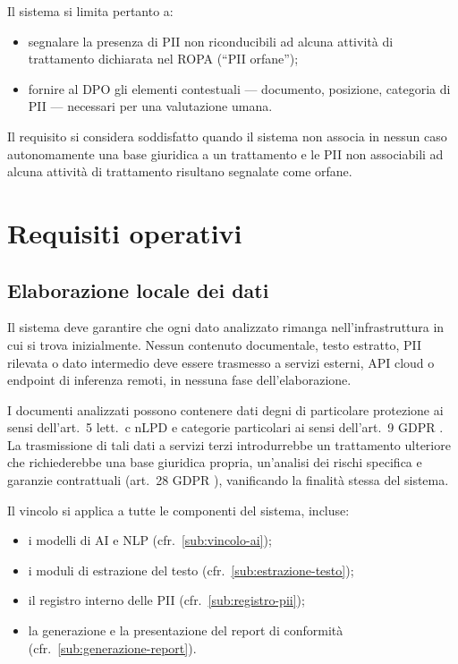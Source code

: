 Il sistema si limita pertanto a:
\begin{itemize}
	\item segnalare la presenza di PII non riconducibili ad alcuna attività di trattamento dichiarata nel ROPA (``PII orfane'');
	\item fornire al DPO gli elementi contestuali --- documento, posizione, categoria di PII --- necessari per una valutazione umana.
\end{itemize} \medskip

Il requisito si considera soddisfatto quando il sistema non associa in nessun caso autonomamente una base giuridica a un trattamento e le PII non associabili ad alcuna attività di trattamento risultano segnalate come orfane.


\section{Requisiti operativi}
\label{sec:requisiti-operativi}

\subsection{Elaborazione locale dei dati}
\label{sub:elaborazione-locale}
Il sistema deve garantire che ogni dato analizzato rimanga nell'infrastruttura in cui si trova inizialmente. Nessun contenuto documentale, testo estratto, PII rilevata o dato intermedio deve essere trasmesso a servizi esterni, API cloud o endpoint di inferenza remoti, in nessuna fase dell'elaborazione. \medskip

I documenti analizzati possono contenere dati degni di particolare protezione ai sensi dell'art.~5 lett.~c nLPD \cite{RS2351Legge} e categorie particolari ai sensi dell'art.~9 GDPR \cite{RegolamentoUE20162016}. La trasmissione di tali dati a servizi terzi introdurrebbe un trattamento ulteriore che richiederebbe una base giuridica propria, un'analisi dei rischi specifica e garanzie contrattuali (art.~28 GDPR \cite{RegolamentoUE20162016}), vanificando la finalità stessa del sistema. \medskip

Il vincolo si applica a tutte le componenti del sistema, incluse:
\begin{itemize}
	\item i modelli di AI e NLP (cfr.~\ref{sub:vincolo-ai});
	\item i moduli di estrazione del testo (cfr.~\ref{sub:estrazione-testo});
	\item il registro interno delle PII (cfr.~\ref{sub:registro-pii});
	\item la generazione e la presentazione del report di conformità (cfr.~\ref{sub:generazione-report}).
\end{itemize} \medskip

